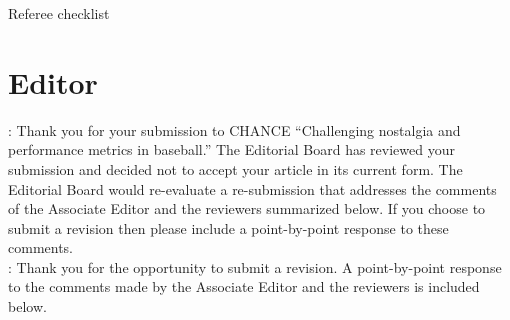 \documentclass[11pt]{article}
\begin{document}
\footnotesize

\color{black}
\normalsize 

\bigskip

\begin{center}
{\LARGE Referee checklist}
\end{center}


\section*{Editor}


: 
Thank you for your submission to CHANCE ``Challenging nostalgia and 
performance metrics in baseball.''  The Editorial Board has reviewed your 
submission and decided not to accept your article in its current form.  The 
Editorial Board would re-evaluate a re-submission that addresses the comments 
of the Associate Editor and the reviewers summarized below.  If you choose to 
submit a revision then please include a point-by-point response to these 
comments. \\

: Thank you for the opportunity to submit a 
revision.  A point-by-point response to the comments made by the Associate 
Editor and the reviewers is included below.
\end{document}
